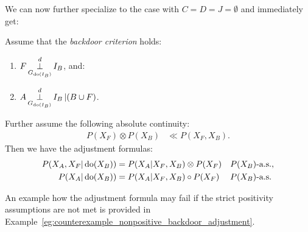 We can now further specialize to the case with $C=D=J= \emptyset$ and immediately get:

\begin{Cor}
    \label{cor:backdoor_adjustment}
    Assume that the \emph{backdoor criterion} holds:
\begin{enumerate}
    \item $\displaystyle F \operatorname*{\perp}^d_{G_{\operatorname{do}(I_B)}} I_B$, and:
    \item $\displaystyle A \operatorname*{\perp}^d_{G_{\operatorname{do}(I_B)}} I_B  \operatorname*{|} (B \cup F)$.
\end{enumerate}
    Further assume the following absolute continuity:
  \begin{align*}
      P(X_F) \otimes P(X_B) &\ll  P(X_F,X_B).
  \end{align*}
Then we have the adjustment formulas: 
\begin{align*} 
    P(X_A,X_F|\operatorname{do}(X_B)) &= P(X_A|X_F,X_B) \otimes P(X_F)  && P(X_B)\text{-a.s.}, \\
    P(X_A|\operatorname{do}(X_B)) &= P(X_A|X_F,X_B) \circ P(X_F)   && P(X_B)\text{-a.s.}
\end{align*}
\end{Cor}

\begin{Rem}
An example how the adjustment formula may fail if the strict positivity assumptions are not met is provided in Example~\ref{eg:counterexample_nonpositive_backdoor_adjustment}.
\end{Rem}
